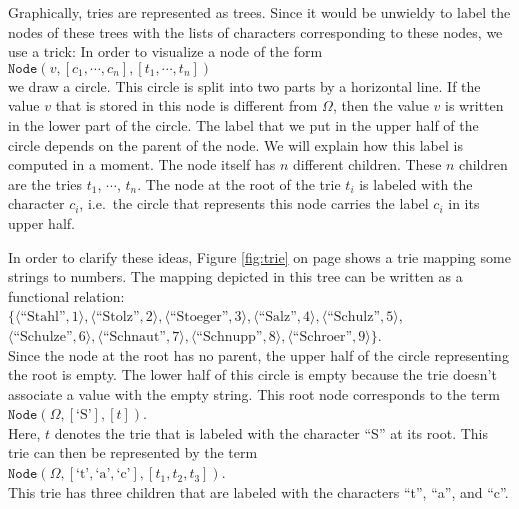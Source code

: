 Graphically, tries are represented as trees.  Since it would be unwieldy to label the nodes of these
trees with the lists of characters corresponding to these nodes, we use a trick:  In order to
visualize a node of the form \\[0.2cm]
\hspace*{1.3cm} 
$\texttt{Node}(v, [c_1, \cdots, c_n], [t_1, \cdots, t_n])$ \\[0.2cm]
we draw a circle.  This circle is split into two parts by a horizontal line.
If the value  $v$ that is stored in this node is different from $\Omega$, then the value $v$ is
written in the lower part of the circle.  The label that we put in the upper half of the circle
depends on the parent of the node.  We will explain how this label is computed in a moment.
The node itself has $n$ different children.  These $n$ children are the tries
$t_1$, $\cdots$, $t_n$.  The node at the root of the trie $t_i$ is labeled with the character $c_i$,
i.e.~the circle that represents this node carries the label $c_i$ in its upper half.

In order to clarify these ideas, Figure  \ref{fig:trie} on page \pageref{fig:trie} shows a trie
mapping some strings to numbers.  The mapping depicted in this tree can be written as a functional
relation: 
\\[0.2cm]
\hspace*{1.3cm} $ \bigl\{ \langle \textrm{``Stahl''},   1  \rangle, \langle \textrm{``Stolz''},     2  \rangle, \langle \textrm{``Stoeger''},   3  \rangle, 
             \langle \textrm{``Salz''},      4  \rangle, \langle \textrm{``Schulz''},    5  \rangle$, \\[0.2cm]
\hspace*{1.5cm} $\langle \textrm{``Schulze''},   6  \rangle, \langle \textrm{``Schnaut''},   7  \rangle, 
  \langle \textrm{``Schnupp''},   8  \rangle, 
  \langle \textrm{``Schroer''},   9  \rangle\}$. \\[0.2cm]
Since the node at the root has no parent, the upper half of  the circle representing the root is
empty.  The lower half of  this circle is empty because the trie doesn't associate a value with the
empty string.  This root node corresponds to the term 
\\[0.2cm]
\hspace*{1.3cm}
 $\texttt{Node}(\Omega,[\textrm{`S'}], [t])$. 
\\[0.2cm]
Here,  $t$ denotes the trie that is labeled with the character  ``S'' at its root.
This trie can then be represented by the term  \\[0.2cm]
\hspace*{1.3cm} 
$\texttt{Node}(\Omega,[\textrm{`t'},\textrm{`a'},\textrm{`c'}], [t_1, t_2, t_3])$. \\[0.2cm]
This trie has three children that are labeled with the characters  ``t'', ``a'', and ``c''.

